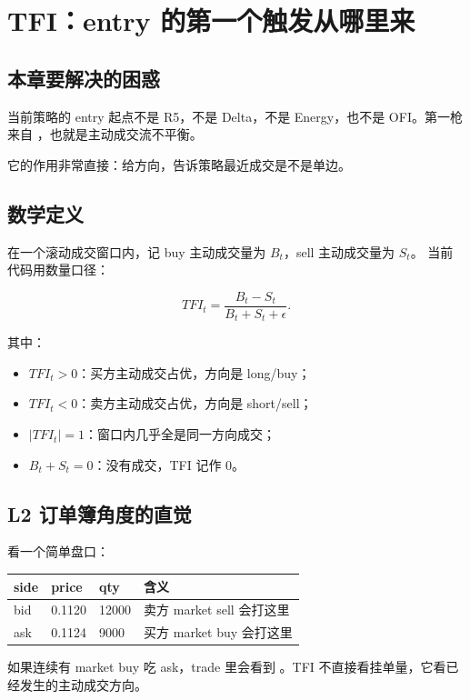 \chapter{TFI：entry 的第一个触发从哪里来}

\section{本章要解决的困惑}

当前策略的 entry 起点不是 R5，不是 Delta，不是 Energy，也不是 OFI。第一枪来自
，也就是主动成交流不平衡。

它的作用非常直接：给方向，告诉策略最近成交是不是单边。

\section{数学定义}

在一个滚动成交窗口内，记 buy 主动成交量为 \(B_t\)，sell 主动成交量为 \(S_t\)。
当前代码用数量口径：

\[
TFI_t = \frac{B_t - S_t}{B_t + S_t + \epsilon}.
\]

其中：

\begin{itemize}[leftmargin=2em]
  \item \(TFI_t > 0\)：买方主动成交占优，方向是 long/buy；
  \item \(TFI_t < 0\)：卖方主动成交占优，方向是 short/sell；
  \item \(|TFI_t| = 1\)：窗口内几乎全是同一方向成交；
  \item \(B_t+S_t=0\)：没有成交，TFI 记作 0。
\end{itemize}

\section{L2 订单簿角度的直觉}

看一个简单盘口：

\begin{longtable}{p{}p{}p{}p{}}
\toprule
side & price & qty & 含义 \\
\midrule
bid & 0.1120 & 12000 & 卖方 market sell 会打这里 \\
ask & 0.1124 & 9000 & 买方 market buy 会打这里 \\
\bottomrule
\end{longtable}

如果连续有 market buy 吃 ask，trade 里会看到 。TFI 不直接看挂单量，它看已经发生的主动成交方向。

